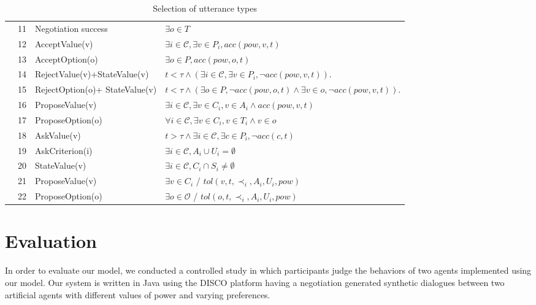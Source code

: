 \documentclass{llncs}
\begin{document}
\begin{table}[!t]
{\begin{tabular}{|p{.3cm}|p{.6cm}|p{3cm}|p{7.5cm}|}
					\parbox[t]{2mm}{
						} & 11& Negotiation success &  $\exists o \in T$ \\
					&12& AcceptValue(v) & $\exists i\in\mathcal{C}, \exists v \in P_i, acc(pow, v, t)$ \\
					&13&AcceptOption(o) & $\exists o \in P, acc(pow, o, t)$ \\
					&14&RejectValue(v)+\newline StateValue(v) & $ t<\tau \land (\exists i\in\mathcal{C}, \exists v \in P_i, \neg acc(pow,v, t))$.\\
					&15&RejectOption(o)+ \newline StateValue(v) & $ t<\tau \land (\exists o \in P,  \neg acc(pow,o, t) \land \exists v \in o, \neg acc(pow,v, t))$.\\
					&16&ProposeValue(v) &  $\exists i\in\mathcal{C}, \exists v \in C_i, v \in A_i  \land acc(pow, v, t) $\\
					&17&ProposeOption(o)  & $\forall i\in\mathcal{C},\exists v \in C_i, v \in T_i  \land v \in o$ \\
					&18&AskValue(v) & $t > \tau \land \exists i\in\mathcal{C}, \exists c \in P_i, \neg acc(c, t)$ \\
					&19&AskCriterion(i) & $\exists i\in\mathcal{C}, A_i \cup U_i= \emptyset $\\
					&20&StateValue(v) & $\exists i\in\mathcal{C}, C_i\cap S_i \neq \emptyset$	\\
					&21& ProposeValue(v) & $\exists v \in C_i$ / $tol(v, t, \prec_i, A_i, U_i, pow)$\\
					&22& ProposeOption(o) & $\exists o \in \mathcal{O}$ / $tol(o, t, \prec_i, A_i, U_i, pow)$\\
					
					\hline
				\end{tabular}
			}
			\caption{Selection of utterance types}
			\label{table:uttChoice}
		\end{table}
		
		\section{Evaluation}
		\label{sec:evaluation}
						\vspace{-0.5em} 
		In order to evaluate our model, we conducted a controlled study in which participants judge the behaviors of two agents implemented using our model. Our system is written in Java using the DISCO platform \cite{rich09} having a negotiation generated synthetic dialogues between two artificial agents with different values of power and varying preferences.
		
\end{document}
